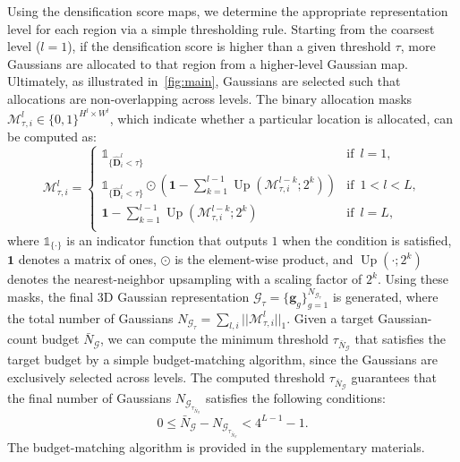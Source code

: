 Using the densification score maps, we determine the appropriate representation level for each region via a simple thresholding rule. Starting from the coarsest level ($l\!=\!1$), if the densification score is higher than a given threshold $\tau$, more Gaussians are allocated to that region from a higher-level Gaussian map. Ultimately, as illustrated in~\cref{fig:main}, Gaussians are selected such that allocations are non-overlapping across levels. The binary allocation masks $\mathcal{M}^l_{\tau,i} \in \{0,1\}^{H^l \times W^l}$, which indicate whether a particular location is allocated, can be computed as:
\vspace{-6pt}
\begin{equation}
\label{eq:feature_selection_mask}
    \mathcal{M}^l_{\tau,i} = 
    \begin{cases}
        \mathds{1}_{\{\hat{\mathbf{D}}^l_i < \tau\}}  & \text{if}\,\,\, l=1,  \\
        \mathds{1}_{\{\hat{\mathbf{D}}^l_i < \tau\}} \odot \left(\mathbf{1}-\sum_{k=1}^{l-1}\operatorname{Up}(\mathcal{M}^{l-k}_{\tau,i}; 2^k)\right)  & \text{if}\,\,\, 1<l<L,  \\
        \mathbf{1}-\sum_{k=1}^{l-1}\operatorname{Up}(\mathcal{M}^{l-k}_{\tau,i}; 2^k)  & \text{if}\,\,\, l = L,  \\
    \end{cases}
\end{equation}
where $\mathds{1}_{\{\cdot\}}$ is an indicator function that outputs $1$ when the condition is satisfied, $\mathbf{1}$ denotes a matrix of ones, $\odot$ is the element-wise product, and $\operatorname{Up}(\cdot;2^k)$ denotes the nearest-neighbor upsampling with a scaling factor of $2^k$. 
Using these masks, the final 3D Gaussian representation $\mathcal{G}_\tau\!=\!\{\mathbf{g}_g\}^{N_{\mathcal{G}_\tau}}_{g=1}$ is generated, where the total number of Gaussians $N_{\mathcal{G}_\tau}\!=\!\sum_{l,i}||\mathcal{M}^l_{\tau,i}||_1$.
Given a target Gaussian-count budget $\bar{N}_\mathcal{G}$, we can compute the minimum threshold $\tau_{\bar{N}_\mathcal{G}}$ that satisfies the target budget by a simple budget-matching algorithm, since the Gaussians are exclusively selected across levels. The computed threshold $\tau_{\bar{N}_\mathcal{G}}$ guarantees that the final number of Gaussians $N_{\mathcal{G}_{\tau_{\bar{N}_\mathcal{G}}}}$ satisfies the following conditions:
{
\setlength{\abovedisplayskip}{3pt}
\setlength{\belowdisplayskip}{3pt}
\setlength{\abovedisplayshortskip}{2pt}
\setlength{\belowdisplayshortskip}{2pt}
\begin{equation}
\label{eq:budget_condition}
    0 \le \bar{N}_\mathcal{G} - N_{\mathcal{G}_{\tau_{\bar{N}_\mathcal{G}}}}\!<4^{L-1}-1.
\end{equation}
}
The budget-matching algorithm is provided in the supplementary materials. 